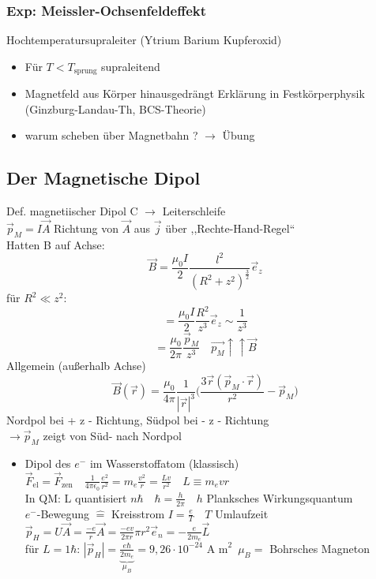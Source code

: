 \documentclass[titlepage,12pt,a4paper,ngerman]{report}
\newcommand{\tx}[1]{\textrm{#1}}
\newcommand{\ub}[1]{\underbrace{#1}}
\begin{document}
\subsubsection{Exp: Meissler-Ochsenfeldeffekt}
Hochtemperatursupraleiter (Ytrium Barium Kupferoxid) \\
\begin{itemize}
	\item Für $ T < T_{\tx{sprung}} $ supraleitend
	\item Magnetfeld aus Körper hinausgedrängt Erklärung in Festkörperphysik (Ginzburg-Landau-Th, BCS-Theorie)
	\item warum scheben über Magnetbahn ? $ \rightarrow $ Übung
\end{itemize}
\subsection{Der Magnetische Dipol}
Def. magnetiischer Dipol C $ \rightarrow $ Leiterschleife\\
$ \vec{p}_M = I \vec{A} $ Richtung von $ \vec{A} $ aus $ \vec{j} $ über ,,Rechte-Hand-Regel``\\
Hatten B auf Achse: $$ \vec{B} = \frac{\mu_0 I}{2} \frac{l^2}{(R^2 + z^2 ) ^{\frac{3}{2}}} \vec{e}_z $$
für $ R^2 \ll z^2 $: $$= \frac{\mu_0 I}{2} \frac{R^2}{z^3} \vec{e}_z \sim \boxed{\frac{1}{z^3}}$$
$$ = \frac{\mu_0 }{2 \pi} \frac{\vec{p}_M}{z^3} \quad \boxed{\vec{p_M} \uparrow \uparrow \vec{B}}$$
Allgemein (außerhalb Achse)\\
$$ \vec{B} (\vec{r}) = \frac{\mu_0}{4 \pi} \frac{1}{| \vec{r} | ^3} \bigg( \frac{3 \vec{r} (\vec{p}_M \cdot \vec{r})}{r^2} - \vec{p}_M \bigg) $$
Nordpol bei + z - Richtung, Südpol bei - z - Richtung\\
$ \rightarrow \vec{p}_M $ zeigt von Süd- nach Nordpol\\
\begin{itemize}
	\item Dipol des $ e^- $ im Wasserstoffatom (klassisch)\\
	$ \vec{F}_{\tx{el}} = \vec{F}_{\tx{zen}} \quad \frac{1}{4 \pi \epsilon_0} \frac{e^2}{r^2} = m_e \frac{v^2}{r} = \frac{Lv}{r^2} \quad L \equiv m_e v r $\\
	In QM: L quantisiert $ n \hbar \quad \hbar = \frac{h}{2 \pi} \quad h $ Planksches Wirkungsquantum\\
	$ e^- $-Bewegung $ \widehat{=} $ Kreisstrom $ I = \frac{e}{T}  \quad T $ Umlaufzeit\\
	$ \vec{p}_H = U \vec{A} = \frac{-e}{r} \vec{A} = \frac{-e v}{2 \pi r} \pi r^2 \vec{e}_n = - \frac{e}{2 m_e} \vec{L} $\\
	für $ L = 1 \hbar $: $ |\vec{p}_H | = \ub{\frac{e \hbar}{2 m_e}}_{\mu_B} = 9,26 \cdot 10^{-24} \tx{ A m} ^2   $\
	$ \mu_B = $ Bohrsches Magneton 
\end{itemize} 
\end{document}

